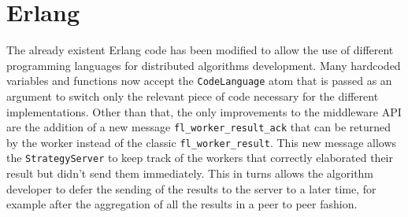 \section{Erlang}
The already existent Erlang code has been modified to allow the use of different programming languages for distributed algorithms development. 
Many hardcoded variables and functions now accept the \texttt{CodeLanguage} atom that is passed as an argument to switch only the relevant piece of code necessary for the different implementations. 
Other than that, the only improvements to the middleware API are the addition of a new message \texttt{fl\_worker\_result\_ack} that can be returned by the worker instead of the classic \texttt{fl\_worker\_result}.
This new message allows the \texttt{StrategyServer} to keep track of the workers that correctly elaborated their result but didn't send them immediately.
This in turns allows the algorithm developer to defer the sending of the results to the server to a later time, for example after the aggregation of all the results in a peer to peer fashion.
